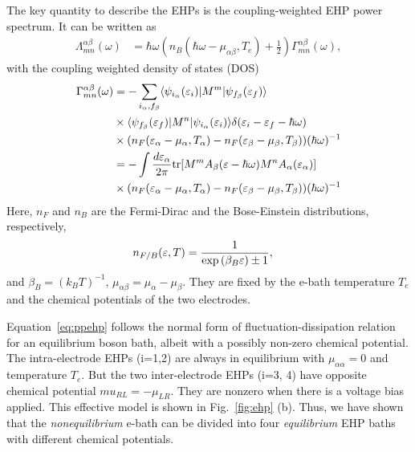 \documentclass[aps
,twocolumn
,floatfix,footinbib,prl
]{revtex4-1}
\begin{document}
The key quantity to describe the EHPs is the coupling-weighted EHP power spectrum. It can be written as
\begin{align}
\Lambda_{mn}^{\alpha\beta}(\omega) &= \hbar\omega\left(n_B(\hbar\omega-\mu_{\alpha\beta},T_e)+\frac{1}{2}\right)\Gamma_{mn}^{\alpha\beta}(\omega),
\label{eq:ppehp}
\end{align}
with the coupling weighted density of states (DOS)
\begin{align}
\Gamma_{mn}^{\alpha\beta}(\omega) &= -\sum_{i_\alpha,f_\beta}\langle \psi_{i_\alpha}(\varepsilon_i)|M^{m}|\psi_{f_\beta}(\varepsilon_f)\rangle\\
&\times\langle\psi_{f_\beta}(\varepsilon_f)|M^{n}|\psi_{i_\alpha}(\varepsilon_i)\rangle \delta(\varepsilon_i-\varepsilon_f-\hbar\omega)\nonumber\\
&\times (n_F(\varepsilon_\alpha-\mu_\alpha,T_\alpha)-n_F(\varepsilon_\beta-\mu_\beta,T_\beta))(\hbar\omega)^{-1}\nonumber\\
&=-\int \frac{d\varepsilon_\alpha}{2\pi} {\rm tr}[M^m A_\beta(\varepsilon-\hbar\omega)M^n A_\alpha(\varepsilon_\alpha)] \nonumber\\
&\times (n_F(\varepsilon_\alpha-\mu_\alpha,T_\alpha)-n_F(\varepsilon_\beta-\mu_\beta,T_\beta))(\hbar\omega)^{-1}
\label{eq:gamma}
\end{align}
Here, $n_{F}$ and $n_B$ are the Fermi-Dirac and the Bose-Einstein distributions, respectively,
\begin{align}
n_{F/B}(\varepsilon,T) &= \frac{1}{{\rm exp}\left(\beta_B \varepsilon\right)\pm 1},
\end{align}
and $\beta_B=(k_BT)^{-1}$, $\mu_{\alpha\beta}=\mu_\alpha-\mu_\beta$. They are fixed by the e-bath temperature $T_e$ and the chemical potentials of the two electrodes. 

Equation~\ref{eq:ppehp} follows the normal form of fluctuation-dissipation relation for an equilibrium boson bath, albeit with a possibly non-zero chemical potential. The intra-electrode EHPs (i=1,2) are always in equilibrium with $\mu_{\alpha\alpha}=0$ and temperature $T_e$. But the two inter-electrode EHPs (i=3, 4) have opposite chemical potential $mu_{RL}=-\mu_{LR}$. They are nonzero when there is a voltage bias applied. This effective model is shown in Fig.~\ref{fig:ehp} (b). Thus, we have shown that the \emph{nonequilibrium} e-bath can be divided into four \emph{equilibrium} EHP baths with different chemical potentials.
\end{document}
